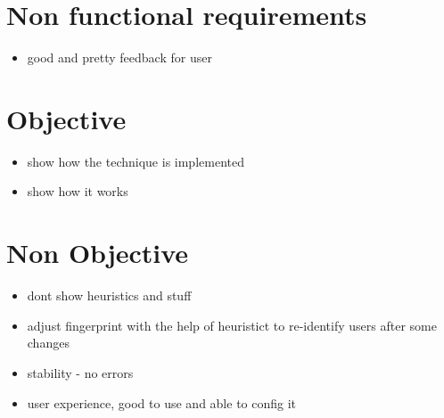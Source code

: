 \section{Non functional requirements}

\begin{itemize}
\item good and pretty feedback for user
\end{itemize}

\section{Objective}
\begin{itemize}
	\item show how the technique is implemented
	\item show how it works
\end{itemize}

\section{Non Objective}
\begin{itemize}
	\item dont show heuristics and stuff
		\item adjust fingerprint with the help of heuristict to re-identify users after some changes
	\item stability - no errors
	\item user experience, good to use and able to config it
\end{itemize}
